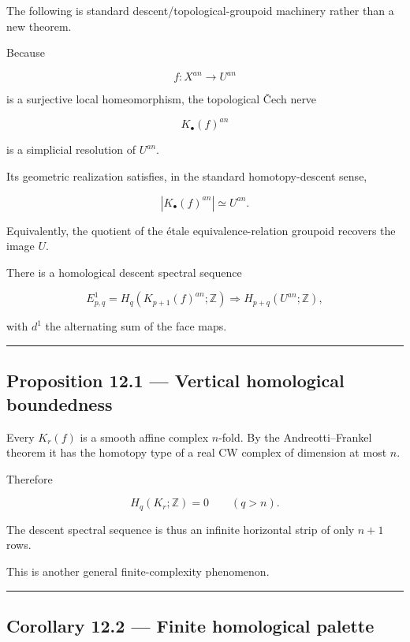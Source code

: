 The following is standard descent/topological-groupoid machinery rather
than a new theorem.

Because

\[
f\colon X^{an}\to U^{an}
\]

is a surjective local homeomorphism, the topological Čech nerve

\[
K_\bullet(f)^{an}
\]

is a simplicial resolution of \(U^{an}\).

Its geometric realization satisfies, in the standard homotopy-descent
sense,

\[
\boxed{
|K_\bullet(f)^{an}|\simeq U^{an}.
}
\]

Equivalently, the quotient of the étale equivalence-relation groupoid
recovers the image \(U\).

There is a homological descent spectral sequence

\[
\boxed{
E^1_{p,q}
=
H_q(K_{p+1}(f)^{an};\mathbb Z)
\Longrightarrow
H_{p+q}(U^{an};\mathbb Z),
}
\]

with \(d^1\) the alternating sum of the face maps.

\begin{center}\rule{0.5\linewidth}{0.5pt}\end{center}

\subsection{Proposition 12.1 --- Vertical homological
boundedness}\label{proposition-12.1-vertical-homological-boundedness}

Every \(K_r(f)\) is a smooth affine complex \(n\)-fold. By the
Andreotti--Frankel theorem it has the homotopy type of a real CW complex
of dimension at most \(n\).

Therefore

\[
H_q(K_r;\mathbb Z)=0
\qquad(q>n).
\]

The descent spectral sequence is thus an infinite horizontal strip of
only \(n+1\) rows.

This is another general finite-complexity phenomenon.

\begin{center}\rule{0.5\linewidth}{0.5pt}\end{center}

\subsection{Corollary 12.2 --- Finite homological
palette}\label{corollary-12.2-finite-homological-palette}

